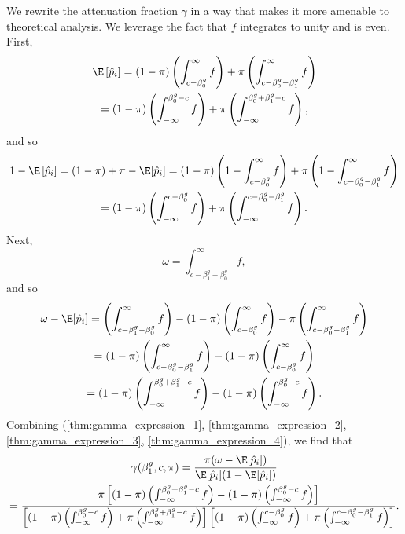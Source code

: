 \documentclass[12pt]{article}
\begin{document}
We rewrite the attenuation fraction $\gamma$ in a way that makes it more amenable to theoretical analysis. We leverage the fact that $f$ integrates to unity and is even.
First,
\begin{multline}\label{thm:gamma_expression_1} \E\left[\hat{p}_i\right] = (1 - \pi) \left( \int_{c - \beta^g_0}^\infty f \right) + \pi \left(\int_{c - \beta_0^g - \beta_1^g}^\infty f \right) \\ = (1 - \pi) \left( \int_{-\infty}^{ \beta_0^g - c} f \right) + \pi \left( \int_{-\infty}^{ \beta^g_0 + \beta^g_1 - c} f \right), \end{multline}
 and so \begin{multline}\label{thm:gamma_expression_2} 1 - \E\left[\hat{p}_i\right] = (1 - \pi) + \pi - \E[\hat{p}_i]  = (1-\pi) \left(1 - \int_{c - \beta_0^g}^\infty f \right)  + \pi \left(1 - \int_{c - \beta^g_0 - \beta^g_1}^\infty f \right) \\ = (1 - \pi) \left( \int_{-\infty}^{c - \beta^g_0} f \right) + \pi \left( \int_{-\infty}^{c - \beta_0^g - \beta_1^g} f \right).
\end{multline}
Next,
\begin{equation}\label{thm:gamma_expression_3}
\omega = \int_{c - \beta^g_1 - \beta^g_0}^\infty f,\end{equation} and so
\begin{multline}\label{thm:gamma_expression_4}
\omega - \E[\hat{p}_i]  = \left( \int_{c - \beta^g_1 - \beta^g_0}^\infty f \right) - (1 - \pi) \left( \int_{c - \beta^g_0}^\infty f \right) - \pi \left( \int_{c - \beta_0^g - \beta_1^g}^\infty f \right) \\ = (1 - \pi) \left(\int_{c - \beta^g_0 - \beta^g_1 }^\infty f \right) - (1- \pi) \left(\int_{c - \beta^g_0}^\infty f \right) \\ =  (1 - \pi)\left(\int_{-\infty}^{\beta_0^g + \beta_1^g - c} f \right) - (1 - \pi) \left( \int_{-\infty}^{ \beta_0^g - c} f \right).
\end{multline}
Combining (\ref{thm:gamma_expression_1}, \ref{thm:gamma_expression_2}, \ref{thm:gamma_expression_3}, \ref{thm:gamma_expression_4}), we find that
\begin{multline}\label{gamma_alternative}
\gamma(\beta^g_1, c, \pi) = \frac{\pi(\omega - \E[\hat{p}_i])}{\E[\hat{p}_i](1 - \E[\hat{p}_i])} \\ = \frac{\pi \left[ (1 - \pi) \left( \int_{ -\infty}^{\beta_0^g + \beta_1^g - c} f \right) - (1 - \pi) \left( \int_{-\infty}^{ \beta_0^g - c} f \right) \right]}{\left[(1-\pi) \left( \int_{-\infty}^{ \beta_0^g - c} f \right) + \pi \left( \int_{-\infty}^{ \beta^g_0 + \beta^g_1 - c} f \right) \right] \left[(1 - \pi) \left( \int_{-\infty}^{c - \beta^g_0} f \right) + \pi \left( \int_{-\infty}^{c - \beta_0^g - \beta_1^g} f \right) \right]}.
\end{multline}
\end{document}
